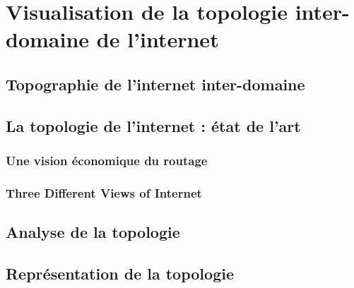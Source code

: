 \section{Visualisation de la topologie inter-domaine de l'internet}
\subsection{Topographie de l'internet inter-domaine}
\subsection{La topologie de l'internet : état de l'art}
\subsubsection{Une vision économique du routage}
\subsubsection{Three Different Views of Internet}
\subsection{Analyse de la topologie}
\subsection{Représentation de la topologie}